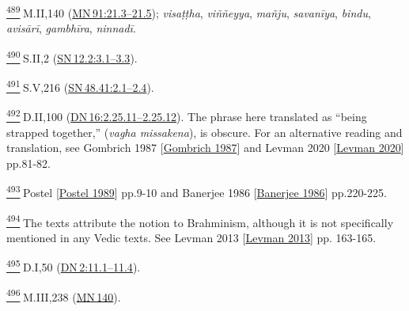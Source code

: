 \label{footprints_split_025.html_fn489}
\hyperref[footprints_split_013.htmlux5cux23fnref489]{\textsuperscript{489}} M.II,140
(\href{https://suttacentral.net/mn91/en/sujato\#21.3}{MN\,91:21.3--21.5});
\emph{visaṭṭha}, \emph{viññeyya}, \emph{mañju}, \emph{savanīya},
\emph{bindu}, \emph{avisārī}, \emph{gambhīra}, \emph{ninnadī}.

\label{footprints_split_025.html_fn490}
\hyperref[footprints_split_013.htmlux5cux23fnref490]{\textsuperscript{490}} S.II,2
(\href{https://suttacentral.net/sn12.2/en/sujato\#3.1}{SN\,12.2:3.1--3.3}).

\label{footprints_split_025.html_fn491}
\hyperref[footprints_split_013.htmlux5cux23fnref491]{\textsuperscript{491}} S.V,216
(\href{https://suttacentral.net/sn48.41/en/sujato\#2.1}{SN\,48.41:2.1--2.4}).

\label{footprints_split_025.html_fn492}
\hyperref[footprints_split_013.htmlux5cux23fnref492]{\textsuperscript{492}} D.II,100
(\href{https://suttacentral.net/dn16/en/sujato\#2.25.11}{DN\,16:2.25.11--2.25.12}).
The phrase here translated as ``being strapped together,'' (\emph{vagha
missakena}), is obscure. For an alternative reading and translation, see
{Gombrich 1987
{{[}\hyperref[footprints_split_022.htmlux5cux23Gombrichux5cux25201987]{Gombrich
1987}{]}}} and {Levman 2020
{{[}\hyperref[footprints_split_022.htmlux5cux23Levmanux5cux25202020]{Levman
2020}{]}}} pp.81-82.

\label{footprints_split_025.html_fn493}
\hyperref[footprints_split_013.htmlux5cux23fnref493]{\textsuperscript{493}} {Postel
{{[}\hyperref[footprints_split_022.htmlux5cux23Postelux5cux25201989]{Postel
1989}{]}}} pp.9-10 and {Banerjee 1986
{{[}\hyperref[footprints_split_022.htmlux5cux23Banerjeeux5cux25201986]{Banerjee
1986}{]}}} pp.220-225.

\label{footprints_split_025.html_fn494}
\hyperref[footprints_split_013.htmlux5cux23fnref494]{\textsuperscript{494}} The
texts attribute the notion to Brahminism, although it is not
specifically mentioned in any Vedic texts. See {Levman 2013
{{[}\hyperref[footprints_split_022.htmlux5cux23Levmanux5cux25202013]{Levman
2013}{]}}} pp. 163-165.

\label{footprints_split_025.html_fn495}
\hyperref[footprints_split_013.htmlux5cux23fnref495]{\textsuperscript{495}} D.I,50
(\href{https://suttacentral.net/dn2/en/sujato\#11.1}{DN\,2:11.1--11.4}).

\label{footprints_split_025.html_fn496}
\hyperref[footprints_split_013.htmlux5cux23fnref496]{\textsuperscript{496}} M.III,238
(\href{https://suttacentral.net/mn140/en/sujato}{MN\,140}).

